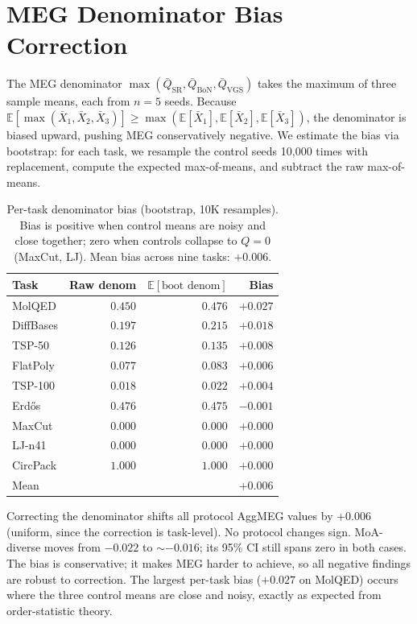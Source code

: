 \documentclass{article}
\begin{document}
\section{MEG Denominator Bias Correction}
\label{app:megbias}

The MEG denominator $\max(\bar{Q}_{\mathrm{SR}}, \bar{Q}_{\mathrm{BoN}}, \bar{Q}_{\mathrm{VGS}})$ takes the maximum of three sample means, each from $n{=}5$ seeds. Because $\mathbb{E}[\max(\bar{X}_1, \bar{X}_2, \bar{X}_3)] \geq \max(\mathbb{E}[\bar{X}_1], \mathbb{E}[\bar{X}_2], \mathbb{E}[\bar{X}_3])$, the denominator is biased upward, pushing MEG conservatively negative. We estimate the bias via bootstrap: for each task, we resample the control seeds 10{,}000 times with replacement, compute the expected max-of-means, and subtract the raw max-of-means.

\begin{table}[h]
\caption{Per-task denominator bias (bootstrap, 10K resamples). Bias is positive when control means are noisy and close together; zero when controls collapse to $Q{=}0$ (MaxCut, LJ). Mean bias across nine tasks: $+0.006$.}
\label{tab:megbias}
\centering
\small
\begin{tabular}{l r r r}
\toprule
Task & Raw denom & $\mathbb{E}[\text{boot denom}]$ & Bias \\
\midrule
MolQED       & $0.450$ & $0.476$ & $+0.027$ \\
DiffBases    & $0.197$ & $0.215$ & $+0.018$ \\
TSP-50       & $0.126$ & $0.135$ & $+0.008$ \\
FlatPoly     & $0.077$ & $0.083$ & $+0.006$ \\
TSP-100      & $0.018$ & $0.022$ & $+0.004$ \\
Erd\H{o}s    & $0.476$ & $0.475$ & $-0.001$ \\
MaxCut       & $0.000$ & $0.000$ & $+0.000$ \\
LJ-n41       & $0.000$ & $0.000$ & $+0.000$ \\
CircPack     & $1.000$ & $1.000$ & $+0.000$ \\
\midrule
Mean         &         &         & $+0.006$ \\
\bottomrule
\end{tabular}
\end{table}

Correcting the denominator shifts all protocol AggMEG values by $+0.006$ (uniform, since the correction is task-level). No protocol changes sign. MoA-diverse moves from $-0.022$ to ${\sim}{-}0.016$; its 95\% CI still spans zero in both cases. The bias is conservative; it makes MEG harder to achieve, so all negative findings are robust to correction. The largest per-task bias ($+0.027$ on MolQED) occurs where the three control means are close and noisy, exactly as expected from order-statistic theory.
\end{document}

